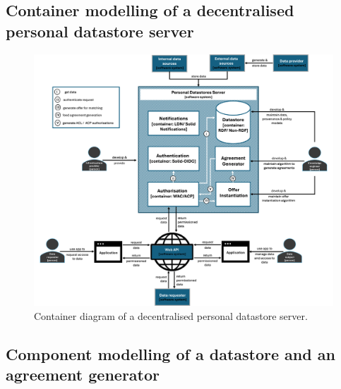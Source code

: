 \subsection{Container modelling of a decentralised personal datastore server}
\label{sec:c4_container}

\begin{figure}[ht]
    \centering
    \includegraphics[width=1\linewidth]{figures//chapter-6/container.png}
    \caption{Container diagram of a decentralised personal datastore server.}
    \label{fig:c4-container}
\end{figure}

\subsection{Component modelling of a datastore and an agreement generator}
\label{sec:c4_component}

